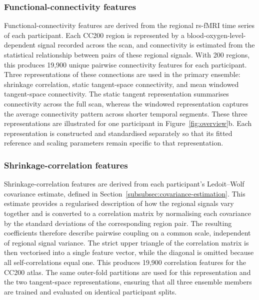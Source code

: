 \subsubsection{Functional-connectivity features}
\label{subsubsec:connectivity-features}

Functional-connectivity features are derived from the regional rs-fMRI time series of each
participant. Each CC200 region is represented by a blood-oxygen-level-dependent signal
recorded across the scan, and connectivity is estimated from the statistical relationship
between pairs of these regional signals. With 200 regions, this produces 19,900 unique
pairwise connectivity features for each participant. Three representations of these
connections are used in the primary ensemble: shrinkage correlation, static tangent-space
connectivity, and mean windowed tangent-space connectivity. The static tangent
representation summarises connectivity across the full scan, whereas the windowed
representation captures the average connectivity pattern across shorter temporal segments.
These three representations are illustrated for one participant in
Figure~\ref{fig:overview}b. Each representation is constructed and standardised separately
so that its fitted reference and scaling parameters remain specific to that representation.

\subsubsection{Shrinkage-correlation features}
\label{subsubsec:shrinkage-correlation}

Shrinkage-correlation features are derived from each participant's Ledoit--Wolf covariance
estimate, defined in Section~\ref{subsubsec:covariance-estimation}. This estimate provides a regularised
description of how the regional signals vary together and is converted to a correlation
matrix by normalising each covariance by the standard deviations of the corresponding
region pair. The resulting coefficients therefore describe pairwise coupling on a common
scale, independent of regional signal variance. The strict upper triangle of the
correlation matrix is then vectorised into a single feature vector, while the diagonal is
omitted because all self-correlations equal one. This produces 19,900 correlation features
for the CC200 atlas. The same outer-fold partitions are used for this representation and
the two tangent-space representations, ensuring that all three ensemble members are
trained and evaluated on identical participant splits.

